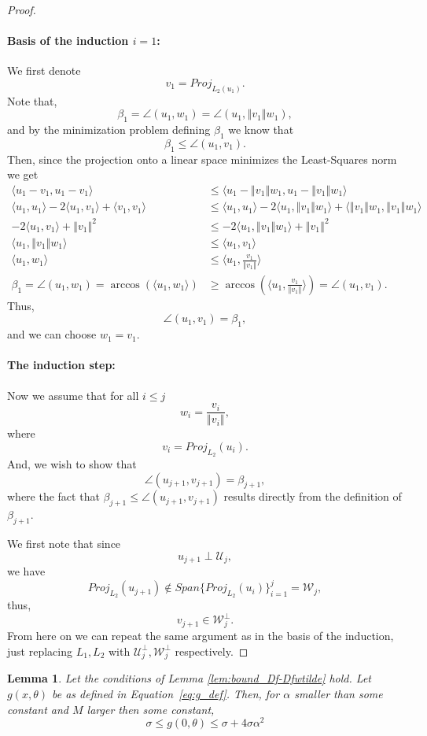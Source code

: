 \documentclass[12pt]{article}
\newtheorem{Lemma}[Theorem]{Lemma}
\theoremstyle{remark}
\newcommand{\UU}{\mathcal{U}}
\newcommand{\WW}{\mathcal{W}}
\newcommand{\norm}[1]{\left\Vert #1 \right\Vert}
\newcommand{\lrangle}[1]{\langle #1 \rangle}
\begin{document}
\begin{appendices}
\begin{proof}
	\paragraph*{Basis of the induction $ i=1 $:}
	We first denote
	\[
	v_1 = Proj_{L_2(u_1)}
	.\]
	Note that,
	\[
	\beta_1 = \angle(u_1, w_1) = \angle(u_1, \norm{v_1} w_1 )
	,\]
	and by the minimization problem defining $ \beta_1 $ we know that
	\[
	\beta_1 \leq \angle(u_1, v_1)
	.\]
	Then, since the projection onto a linear space minimizes the Least-Squares norm we get
	\begin{align*}
	\lrangle{u_1 - v_1, u_1 - v_1} 
	&\leq 
	\lrangle{u_1 - \norm{v_1}w_1, u_1 - \norm{v_1}w_1}\\
	\lrangle{u_1,u_1} - 2\lrangle{u_1, v_1} + \lrangle{v_1,v_1} 
	&\leq
	 \lrangle{u_1,u_1} - 2\lrangle{u_1, \norm{v_1}w_1} + \lrangle{\norm{v_1}w_1,\norm{v_1}w_1} \\
	 - 2\lrangle{u_1, v_1} + \norm{v_1}^2 
	 &\leq
	 - 2\lrangle{u_1, \norm{v_1}w_1} + \norm{v_1}^2 \\
	 \lrangle{u_1, \norm{v_1}w_1} 
	 &\leq
	 \lrangle{u_1, v_1}\\
	 \lrangle{u_1, w_1} 
	 &\leq
	 \lrangle{u_1, \frac{v_1}{\norm{v_1}}}
	 \\
	 \beta_1 =
	 \angle(u_1, w_1) =
	 \arccos(\lrangle{u_1, w_1}) 
	 &\geq
	 \arccos(\lrangle{u_1, \frac{v_1}{\norm{v_1}}}) = \angle(u_1, v_1)
	.\end{align*}
	Thus, 
	\[
	\angle(u_1, v_1) = \beta_1
	,\]
	and we can choose $ w_1 = v_1 $.
	\paragraph*{The induction step:}
	Now we assume that for all $ i\leq j $
	\[
	w_i = \frac{v_i}{\norm{v_i}}
	,\]
	where
	\[
	v_i = Proj_{L_2}(u_i)
	.\]
	And, we wish to show that 
	\[
	\angle(u_{j+1}, v_{j+1}) = \beta_{j+1}
	,\]
	where the fact that $ \beta_{j+1} \leq  \angle(u_{j+1}, v_{j+1})$ results directly from the definition of $ \beta_{j+1} $.
	
	We first note that since
	\[
	u_{j+1}\perp\UU_j
	,\]
	we have
	\[	Proj_{L_2}(u_{j+1})\notin Span\{Proj_{L_2}(u_i)\}_{i=1}^j = \WW_j
	,\]
	thus, 
	\[
	v_{j+1} \in \WW_j^\perp  
	.\]
	From here on we can repeat the same argument as in the basis of the induction, just replacing $ L_1, L_2 $ with $ \UU_j^\perp, \WW_j^\perp $ respectively.
\end{proof}


\begin{Lemma}\label{lem:g_bond_weak}
Let the conditions of Lemma \ref{lem:bound_Df-Dfwtilde} hold.
Let $g(x, \theta)$ be as defined in Equation~\eqref{eq:g_def}.
Then, for $\alpha$ smaller than some constant and $M$ larger then some constant, 
\[
\sigma \leq g(0,\theta) \leq \sigma +  4\sigma \alpha^2
\]
\end{Lemma}


\end{appendices}
\end{document}

